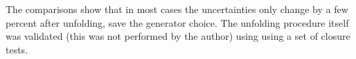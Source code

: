 The comparisons show that in most cases the uncertainties only change by a few percent after unfolding, save the \ewwy generator choice. The unfolding procedure itself was validated (this was not performed by the author) using using a set of closure tests.
%
%
%
%



%


